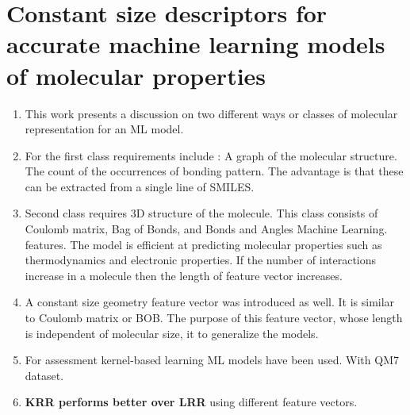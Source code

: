 \documentclass[]{report}
\begin{document}
\section{Constant size descriptors for accurate machine learning models of molecular properties}
\begin{enumerate}
    \item This work presents a discussion on two different ways or classes of molecular representation for an ML model.
    \item For the first class requirements include : 
    A graph of the molecular structure.
    The count of the occurrences of bonding pattern. The advantage is that these can be extracted from a single line of SMILES.
    \item Second class requires 3D structure of the molecule. This class consists of Coulomb matrix, Bag of Bonds, and Bonds and Angles Machine Learning. features. The model is efficient at predicting molecular properties such as thermodynamics and electronic properties. 
    \subitem If the number of interactions increase in a molecule then the length of feature vector increases. 
    \item A constant size geometry feature vector was introduced as well. It is similar to Coulomb matrix or BOB. The purpose of this feature vector, whose length is independent of molecular size, it to generalize the models.
    \item For assessment kernel-based learning ML models have been used. With QM7 dataset.
    \item \textbf{KRR performs better over LRR} using different feature vectors.
\end{enumerate}

	
\end{document}
